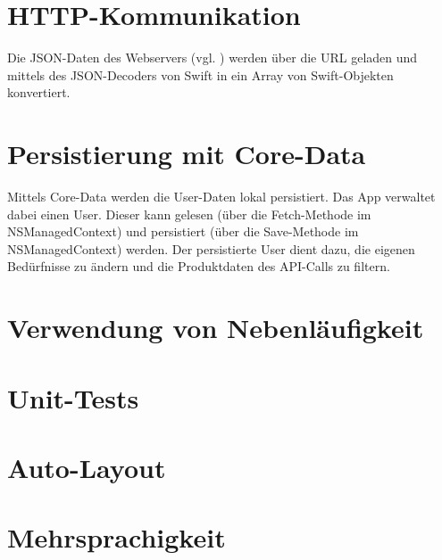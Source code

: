 \documentclass[12pt,titlepage]{article}
\begin{document}
\section*{HTTP-Kommunikation}
Die JSON-Daten des Webservers (vgl. ) werden über die URL geladen und mittels des JSON-Decoders von Swift in ein Array von Swift-Objekten konvertiert. 

\section*{Persistierung mit Core-Data}
Mittels Core-Data werden die User-Daten lokal persistiert. Das App verwaltet dabei einen User. Dieser kann gelesen (über die Fetch-Methode im NSManagedContext) und persistiert (über die Save-Methode im NSManagedContext) werden. Der persistierte User dient dazu, die eigenen Bedürfnisse zu ändern und die Produktdaten des API-Calls zu filtern.

\section*{Verwendung von Nebenläufigkeit}


\section*{Unit-Tests}

\section*{Auto-Layout}

\section*{Mehrsprachigkeit}
\end{document}
